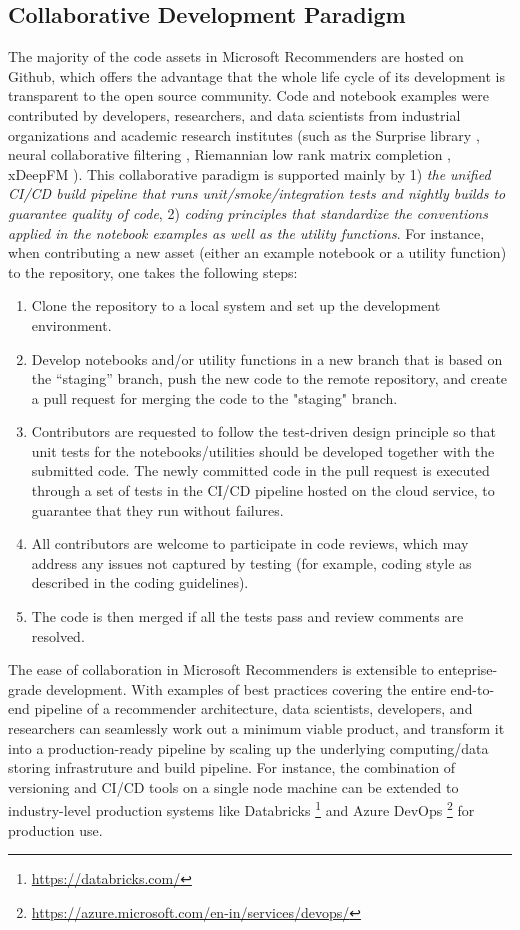 \subsection{Collaborative Development Paradigm} %

The majority of the code assets in Microsoft Recommenders are hosted on Github, which offers the advantage that the whole life cycle of its development is transparent to the open source community. Code and notebook examples were contributed by developers, researchers, and data scientists from industrial organizations and academic research institutes (such as the Surprise library \cite{Surprise}, neural collaborative filtering \cite{he2017neural}, Riemannian low rank matrix completion \cite{rlrmc}, xDeepFM \cite{lian2018xdeepfm}). 
This collaborative paradigm is supported mainly by 1) \textit{the unified CI/CD build pipeline that runs unit/smoke/integration tests and nightly builds to guarantee quality of code}, 2) \textit{coding principles that standardize the conventions applied in the notebook examples as well as the utility functions}. For instance, when contributing a new asset (either an example notebook or a utility function) to the repository, one takes the following steps:
\begin{enumerate}
    \item Clone the repository to a local system and set up the development environment.
    \item Develop notebooks and/or utility functions in a new branch that is based on the ``staging'' branch, push the new code to the remote repository, and create a pull request for merging the code to the "staging" branch.
    \item Contributors are requested to follow the test-driven design principle so that unit tests for the notebooks/utilities should be developed together with the submitted code. The newly committed code in the pull request is executed through a set of tests in the CI/CD pipeline hosted on the cloud service, to guarantee that they run without failures.
    \item All contributors are welcome to participate in code reviews, which may address any issues not captured by testing 
    (for example, coding style as described in the coding guidelines).  
    \item The code is then merged if all the tests pass and review comments are resolved.
\end{enumerate}

The ease of collaboration in Microsoft Recommenders is extensible to enteprise-grade development. With examples of best practices covering the entire end-to-end pipeline of a recommender architecture, data scientists, developers, and researchers can seamlessly work out a minimum viable product, and transform it into a production-ready pipeline by scaling up the underlying computing/data storing infrastruture and build pipeline. For instance, the combination of versioning and CI/CD tools on a single node machine can be extended to industry-level production systems like Databricks \footnote{\url{https://databricks.com/}} and Azure DevOps \footnote{\url{https://azure.microsoft.com/en-in/services/devops/}} for production use.
